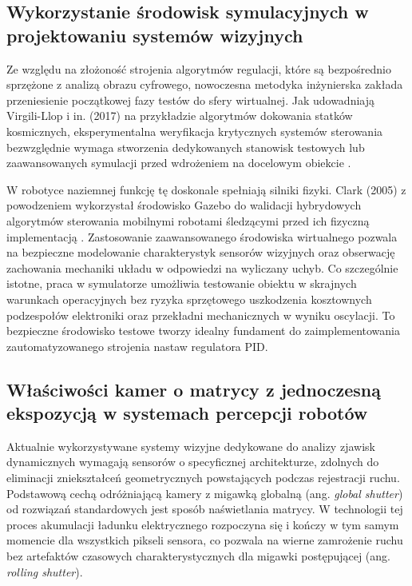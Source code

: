 \documentclass[a4paper,twoside,12pt]{book}
\begin{document}
\subsection{Wykorzystanie środowisk symulacyjnych w projektowaniu systemów wizyjnych}

Ze względu na złożoność strojenia algorytmów regulacji, które są bezpośrednio sprzężone z analizą obrazu cyfrowego, nowoczesna metodyka inżynierska zakłada przeniesienie początkowej fazy testów do sfery wirtualnej. Jak udowadniają Virgili-Llop i in. (2017) na przykładzie algorytmów dokowania statków kosmicznych, eksperymentalna weryfikacja krytycznych systemów sterowania bezwzględnie wymaga stworzenia dedykowanych stanowisk testowych lub zaawansowanych symulacji przed wdrożeniem na docelowym obiekcie \cite{bib:VirgiliLlop2017}. 

W robotyce naziemnej funkcję tę doskonale spełniają silniki fizyki. Clark (2005) z powodzeniem wykorzystał środowisko Gazebo do walidacji hybrydowych algorytmów sterowania mobilnymi robotami śledzącymi przed ich fizyczną implementacją \cite{bib:Clark2005}. Zastosowanie zaawansowanego środowiska wirtualnego pozwala na bezpieczne modelowanie charakterystyk sensorów wizyjnych oraz obserwację zachowania mechaniki układu w odpowiedzi na wyliczany uchyb. Co szczególnie istotne, praca w symulatorze umożliwia testowanie obiektu w skrajnych warunkach operacyjnych bez ryzyka sprzętowego uszkodzenia kosztownych podzespołów elektroniki oraz przekładni mechanicznych w wyniku oscylacji. To bezpieczne środowisko testowe tworzy idealny fundament do zaimplementowania zautomatyzowanego strojenia nastaw regulatora PID.

\subsection{Właściwości kamer o matrycy z jednoczesną ekspozycją w systemach percepcji robotów}

Aktualnie wykorzystywane systemy wizyjne dedykowane do analizy zjawisk dynamicznych wymagają sensorów o specyficznej architekturze, zdolnych do eliminacji zniekształceń geometrycznych powstających podczas rejestracji ruchu. Podstawową cechą odróżniającą kamery z migawką globalną (ang. \textit{global shutter}) od rozwiązań standardowych jest sposób naświetlania matrycy. W technologii tej proces akumulacji ładunku elektrycznego rozpoczyna się i kończy w tym samym momencie dla wszystkich pikseli sensora, co pozwala na wierne zamrożenie ruchu bez artefaktów czasowych charakterystycznych dla migawki postępującej (ang. \textit{rolling shutter}).
\end{document}
